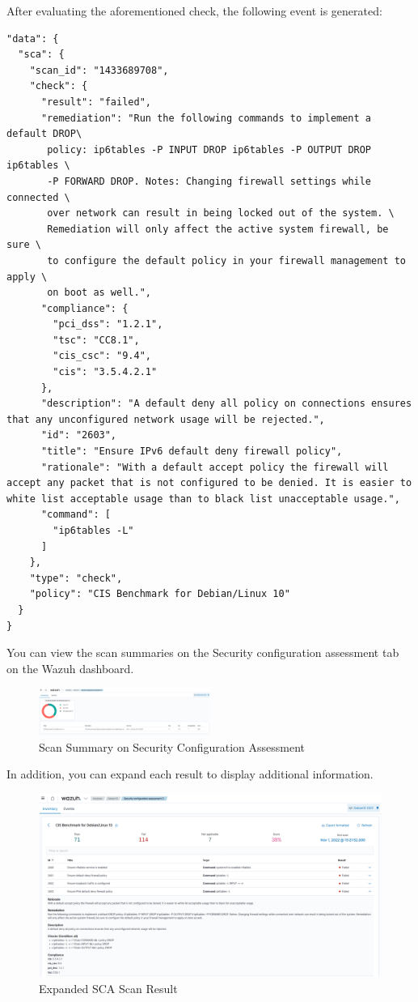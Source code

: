 After evaluating the aforementioned check, the following event is generated:
\begin{verbatim}
"data": {
  "sca": {
    "scan_id": "1433689708",
    "check": {
      "result": "failed",
      "remediation": "Run the following commands to implement a default DROP\
       policy: ip6tables -P INPUT DROP ip6tables -P OUTPUT DROP ip6tables \
       -P FORWARD DROP. Notes: Changing firewall settings while connected \
       over network can result in being locked out of the system. \
       Remediation will only affect the active system firewall, be sure \
       to configure the default policy in your firewall management to apply \
       on boot as well.",
      "compliance": {
        "pci_dss": "1.2.1",
        "tsc": "CC8.1",
        "cis_csc": "9.4",
        "cis": "3.5.4.2.1"
      },
      "description": "A default deny all policy on connections ensures that any unconfigured network usage will be rejected.",
      "id": "2603",
      "title": "Ensure IPv6 default deny firewall policy",
      "rationale": "With a default accept policy the firewall will accept any packet that is not configured to be denied. It is easier to white list acceptable usage than to black list unacceptable usage.",
      "command": [
        "ip6tables -L"
      ]
    },
    "type": "check",
    "policy": "CIS Benchmark for Debian/Linux 10"
  }
}
\end{verbatim}
You can view the scan summaries on the Security configuration assessment tab on the Wazuh dashboard.
\begin{figure} [H]
    \centering
    \includegraphics[width=0.5\textwidth]{images/sca/sca-12.png}
    \caption{Scan Summary on Security Configuration Assessment}
    \label{fig:sca-12}
\end{figure}

In addition, you can expand each result to display additional information.
\begin{figure} [H]
    \centering
    \includegraphics[width=\textwidth]{images/sca/sca-13.png}
    \caption{Expanded SCA Scan Result}
    \label{fig:sca-13}
\end{figure}

